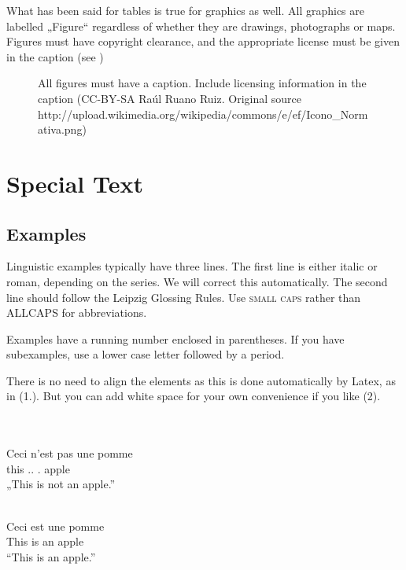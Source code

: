 What has been said for tables is true for graphics as well. All graphics are labelled „Figure“ regardless of whether they are drawings, photographs or maps. Figures must have copyright clearance, and the appropriate license must be given in the caption (see )

\begin{figure}
\caption{All figures must have a caption. Include licensing information in the caption (CC-BY-SA Raúl Ruano Ruiz. Original source http://upload.wikimedia.org/wikipedia/commons/e/ef/Icono\_Normativa.png)}
\label{fig:key:1}
\end{figure}

\chapter{Special Text}

\section{Examples} 

Linguistic examples typically have three lines.  The first line is either italic or roman, depending on the series. We will correct this automatically. The second line should follow the Leipzig Glossing Rules. Use {\textsc{small caps}} rather than ALLCAPS for abbreviations.

Examples have a running number enclosed in parentheses. If you have subexamples, use a lower case letter followed by a period.

There is no need to align the elements as this is done automatically by Latex, as in (1.). But you can add white space for your own convenience if you like (2).

\ea\label{ex:key:}
\\
\\
\gll Ceci n'est pas une pomme\\
     this  ..    . apple\\
\glt „This is not an apple.”
\z

\ea\label{ex:key:} 

\\
\gll Ceci est une pomme\\
     This is an apple\\
\glt “This is an apple.”
\z

